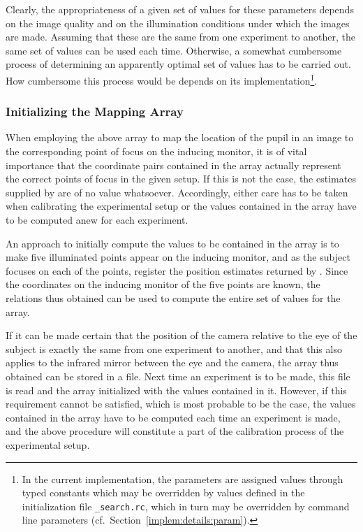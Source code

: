 Clearly, the appropriateness of a given set of values for these
parameters depends on the image quality and on the illumination
conditions under which the images are made.  Assuming that these are
the same from one experiment to another, the same set of values can be
used each time.  Otherwise, a somewhat cumbersome process of
determining an apparently optimal set of values has to be carried out.
How cumbersome this process would be depends on its
implementation\footnote{In the current implementation, the parameters
  are assigned values through typed constants which may be overridden
  by values defined in the initialization file {\tt \_search.rc\/}, 
  which in turn may be overridden by command line parameters (cf.\ 
  Section~\ref{implem:details:param}).}.

\subsubsection{Initializing the Mapping Array}

When employing the above array to map the location of the pupil in an
image to the corresponding point of focus on the inducing monitor, it
is of vital importance that the coordinate pairs contained in the
array actually represent the correct points of focus in the given
setup.  If this is not the case, the estimates supplied by {\octopus}
are of no value whatsoever.  Accordingly, either care has to be taken
when calibrating the experimental setup or the values contained in
the array have to be computed anew for each experiment.

An approach to initially compute the values to be contained in the
array is to make five illuminated points appear on the inducing
monitor, and as the subject focuses on each of the points, register
the position estimates returned by {\octopus}.  Since the coordinates
on the inducing monitor of the five points are known, the relations
thus obtained can be used to compute the entire set of values for the
array.

If it can be made certain that the position of the camera relative to
the eye of the subject is exactly the same from one experiment to
another, and that this also applies to the infrared mirror between the
eye and the camera, the array thus obtained can be stored in a file.
Next time an experiment is to be made, this file is read and the array
initialized with the values contained in it.  However, if this
requirement cannot be satisfied, which is most probable to be the
case, the values contained in the array have to be computed each time
an experiment is made, and the above procedure will constitute a part
of the calibration process of the experimental setup.

